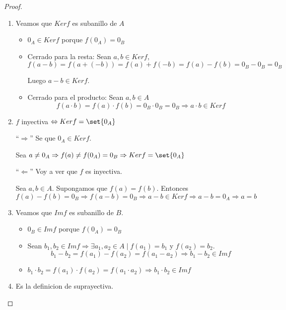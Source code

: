 \begin{proof}
	\begin{enumerate}
		\item Veamos que \(Kerf \) es subanillo de \(A \)
		      
		      \begin{itemize}
			      \item \(0_A \in Kerf \) porque \(f(0_A) = 0_B \)
			      \item Cerrado para la resta: Sean \(a,b \in Kerf \),
			            \[
				            f(a-b) = f(a + (-b)) = f(a) + f(-b) = f(a) - f(b)= 0_B - 0_B = 0_B
			            \]
			            
			            Luego \(a - b \in Kerf \).
			      \item Cerrado para el producto: Sean \(a,b \in A \)
			            \[
				            f(a \cdot b) = f(a) \cdot f(b) = 0_B \cdot 0_B = 0_B \Rightarrow a \cdot b \in Kerf
			            \]
		      \end{itemize}
		\item \(f \) inyectiva \(\iff Kerf = \set{0_A }\)
		      
		      ``\(\Rightarrow \)'' Se que \(0_A \in Kerf \).
		      
		      Sea \(a \neq 0_A \Rightarrow f(a) \neq f(0_A) = 0_B \Rightarrow Kerf = \set{0_A}\)
		      
		      ``\(\Leftarrow \)'' Voy a ver que \(f \) es inyectiva.
		      
		      Sea \(a,b \in A \). Supongamos que \(f(a) = f(b )\). Entonces
		      \[
			      f(a) - f(b) = 0_B \Rightarrow f(a-b) = 0_B \Rightarrow a - b \in Kerf \Rightarrow a - b = 0_A \Rightarrow a = b
		      \]
		\item Veamos que \(Imf \) es subanillo de \(B \).
		      
		      \begin{itemize}
			      \item \(0_B \in Imf\) porque \(f(0_A) = 0_B \)
			      \item Sean \(b_1,b_2 \in Imf \Rightarrow \exists a_1,a_2 \in A \mid f(a_1) = b_1 \) y \(f(a_2) = b_2 \).
			            \[
				            b_1 - b_2 = f(a_1) - f(a_2) = f(a_1 - a_2) \Rightarrow b_1 - b_2 \in Imf
			            \]
			      \item \(b_1 \cdot b_2 = f(a_1) \cdot f(a_2) = f(a_1 \cdot a_2) \Rightarrow b_1 \cdot b_2 \in Imf \)
		      \end{itemize}
		\item Es la definicion de suprayectiva.
	\end{enumerate}
\end{proof}
\pagebreak
